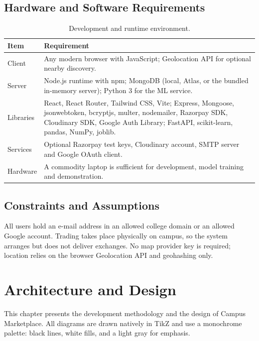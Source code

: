 \documentclass[11pt,letterpaper,oneside]{report}
\begin{document}
\section{Hardware and Software Requirements}
\begin{table}[H]
\centering
\caption{Development and runtime environment.}\label{tab:env}
\small
\begin{tabularx}{\textwidth}{@{}L{2.0cm}X@{}}
\toprule
\textbf{Item} & \textbf{Requirement}\\
\midrule
Client & Any modern browser with JavaScript; Geolocation API for optional nearby discovery.\\
Server & Node.js runtime with npm; MongoDB (local, Atlas, or the bundled in-memory server); Python 3
for the ML service.\\
Libraries & React, React Router, Tailwind CSS, Vite; Express, Mongoose, jsonwebtoken, bcryptjs, multer,
nodemailer, Razorpay SDK, Cloudinary SDK, Google Auth Library; FastAPI, scikit-learn, pandas,
NumPy, joblib.\\
Services & Optional Razorpay test keys, Cloudinary account, SMTP server and Google OAuth client.\\
Hardware & A commodity laptop is sufficient for development, model training and demonstration.\\
\bottomrule
\end{tabularx}
\end{table}

\section{Constraints and Assumptions}
All users hold an e-mail address in an allowed college domain or an allowed Google account. Trading
takes place physically on campus, so the system arranges but does not deliver exchanges. No map
provider key is required; location relies on the browser Geolocation API and geohashing only.

\chapter{Architecture and Design}\label{ch:design}
This chapter presents the development methodology and the design of Campus Marketplace. All
diagrams are drawn natively in TikZ and use a monochrome palette: black lines, white fills, and a
light gray for emphasis.
\end{document}
